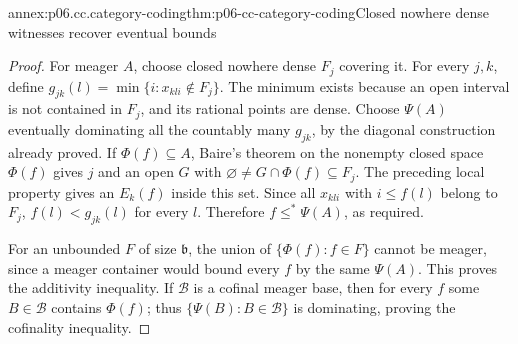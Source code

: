 \begin{annexitem}{annex:p06.cc.category-coding}{thm:p06-cc-category-coding}{Closed nowhere dense witnesses recover eventual bounds}
\begin{proof}
For meager \(A\), choose closed nowhere dense \(F_j\) covering it.
For every \(j,k\), define
\(g_{jk}(l)=\min\{i:x_{kli}\notin F_j\}\). The minimum exists
because an open interval is not contained in \(F_j\), and its rational
points are dense. Choose \(\Psi(A)\) eventually dominating all the
countably many \(g_{jk}\), by the diagonal construction already proved.
If \(\Phi(f)\subseteq A\), Baire's theorem on the nonempty closed
space \(\Phi(f)\) gives \(j\) and an open \(G\) with
\(\varnothing\ne G\cap\Phi(f)\subseteq F_j\). The preceding local
property gives an \(E_k(f)\) inside this set. Since all
\(x_{kli}\) with \(i\leq f(l)\) belong to \(F_j\),
\(f(l)<g_{jk}(l)\) for every \(l\). Therefore
\(f\leq^*\Psi(A)\), as required.

For an unbounded \(F\) of size \(\mathfrak b\), the union of
\(\{\Phi(f):f\in F\}\) cannot be meager, since a meager container
would bound every \(f\) by the same \(\Psi(A)\). This proves the
additivity inequality. If \(\mathcal B\) is a cofinal meager base,
then for every \(f\) some \(B\in\mathcal B\) contains \(\Phi(f)\);
thus \(\{\Psi(B):B\in\mathcal B\}\) is dominating, proving the
cofinality inequality.
\end{proof}
\end{annexitem}


